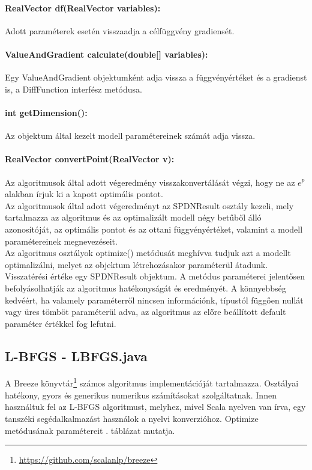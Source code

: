 \paragraph{RealVector df(RealVector variables):} Adott paraméterek esetén visszaadja a célfüggvény gradiensét.
\paragraph{ValueAndGradient calculate(double[] variables):} Egy ValueAndGradient objektumként adja vissza a függvényértéket és a gradienst is, a DiffFunction interfész metódusa.
\paragraph{int getDimension():} Az objektum által kezelt modell paramétereinek számát adja vissza.
\paragraph{RealVector convertPoint(RealVector v):} Az algoritmusok által adott végeredmény visszakonvertálását végzi, hogy ne az $e^p$ alakban írjuk ki a kapott optimális pontot.\\

Az algoritmusok által adott végeredményt az SPDNResult osztály kezeli, mely tartalmazza az algoritmus és az optimalizált modell négy betűből álló azonosítóját, az optimális pontot és az ottani függvényértéket, valamint a modell paramétereinek megnevezéseit. \\

Az algoritmus osztályok optimize() metódusát meghívva tudjuk azt a modellt optimalizálni, melyet az objektum létrehozásakor paraméterül átadunk. Visszatérési értéke egy SPDNResult objektum. A metódus paraméterei jelentősen befolyásolhatják az algoritmus hatékonyságát és eredményét. A könnyebbség kedvéért, ha valamely paraméterről nincsen információnk, típustól függően nullát vagy üres tömböt paraméterül adva, az algoritmus az előre beállított default paraméter értékkel fog lefutni.

\subsection{L-BFGS - LBFGS.java}
A Breeze könyvtár\footnote{\url{https://github.com/scalanlp/breeze}} számos algoritmus implementációját tartalmazza. Osztályai hatékony, gyors és generikus numerikus számításokat szolgáltatnak. Innen használtuk fel az L-BFGS algoritmust, melyhez, mivel Scala nyelven van írva, egy tanszéki segédalkalmazást használok a nyelvi konverzióhoz. Optimize metódusának paramétereit . táblázat mutatja.


